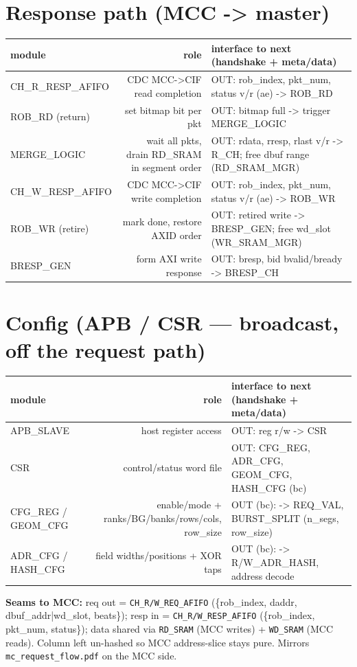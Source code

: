 \documentclass[9pt]{extarticle}
\newenvironment{flow}{%
  \footnotesize\rowcolors{2}{white}{zeb}\begin{longtable}{M R I}
  \rowcolor{hb}\textbf{module} & \textbf{role} & \textbf{interface to next (handshake + meta/data)}\\ \midrule\endhead}
  {\bottomrule\end{longtable}}
\begin{document}
\section{Response path  \textcolor{headbg}{(MCC -> master)}}
\begin{flow}
CH_R_RESP_AFIFO & CDC MCC->CIF read completion & OUT: {rob_index, pkt_num, status}  v/r (ae) -> ROB_RD\\
ROB_RD (return) & set bitmap bit per pkt & OUT: bitmap full -> trigger MERGE_LOGIC\\
MERGE_LOGIC & wait all pkts, drain RD_SRAM in segment order & OUT: {rdata, rresp, rlast}  v/r -> R_CH;  free dbuf range (RD_SRAM_MGR)\\
CH_W_RESP_AFIFO & CDC MCC->CIF write completion & OUT: {rob_index, pkt_num, status}  v/r (ae) -> ROB_WR\\
ROB_WR (retire) & mark done, restore AXID order & OUT: retired write -> BRESP_GEN;  free wd_slot (WR_SRAM_MGR)\\
BRESP_GEN & form AXI write response & OUT: {bresp, bid}  bvalid/bready -> BRESP_CH\\
\end{flow}

\section{Config  \textcolor{headbg}{(APB / CSR --- broadcast, off the request path)}}
\begin{flow}
APB_SLAVE & host register access & OUT: reg r/w -> CSR\\
CSR & control/status word file & OUT: CFG_REG, ADR_CFG, GEOM_CFG, HASH_CFG (bc)\\
CFG_REG / GEOM_CFG & enable/mode + ranks/BG/banks/rows/cols, row_size & OUT (bc): -> REQ_VAL, BURST_SPLIT (n_segs, row_size)\\
ADR_CFG / HASH_CFG & field widths/positions + XOR taps & OUT (bc): -> R/W_ADR_HASH, address decode\\
\end{flow}

\vspace{2pt}
{\footnotesize \textbf{Seams to MCC:} req out = \texttt{CH_R/W_REQ_AFIFO} (\{rob_index, daddr,
dbuf_addr|wd_slot, beats\}); resp in = \texttt{CH_R/W_RESP_AFIFO} (\{rob_index, pkt_num, status\});
data shared via \texttt{RD_SRAM} (MCC writes) + \texttt{WD_SRAM} (MCC reads). Column left un-hashed so
MCC address-slice stays pure. Mirrors \texttt{mc_request_flow.pdf} on the MCC side.}
\end{document}

